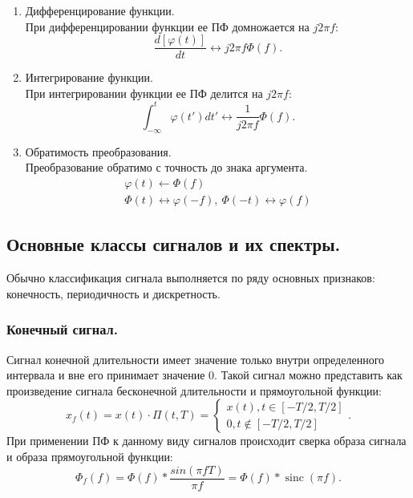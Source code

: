 \documentclass[a4paper,14pt]{extarticle}
\DeclareMathOperator{\sinc}{sinc}
\begin{document}
\begin{enumerate}
\item Дифференцирование функции. \\ При дифференцировании функции ее ПФ домножается на $j 2 \pi f$:
\begin{equation*}
\frac{d[\varphi(t)]}{dt} \leftrightarrow j 2 \pi f \Phi (f).
\end{equation*}

\item Интегрирование функции. \\ При интегрировании функции ее ПФ делится на $j 2 \pi f$:
\begin{equation*}
\int_{-\infty}^{t} \varphi(t') dt' \leftrightarrow \frac{1}{j 2 \pi f} \Phi (f).
\end{equation*}

\item Обратимость преобразования. \\ Преобразование обратимо с точность до знака аргумента. 
\begin{gather*}
\varphi(t) \leftarrow \Phi (f) \\ \Phi(t) \leftrightarrow \varphi (-f), ~ \Phi(-t) \leftrightarrow \varphi(f)
\end{gather*}

\end{enumerate}  


\subsection{Основные классы сигналов и их спектры.}

Обычно классификация сигнала выполняется по ряду основных признаков: конечность, периодичность и дискретность.

\subsubsection{Конечный сигнал.}

Сигнал конечной длительности имеет значение только внутри определенного интервала и вне его принимает значение 0. Такой сигнал можно представить как произведение сигнала бесконечной длительности и прямоугольной функции:
\begin{equation*}
x_f (t) = x(t) \cdot \Pi(t, T) = \begin{cases} x(t), t \in [-T/2, T/2] \\ 0, t \notin  [-T/2, T/2] \end{cases}.
\end{equation*}
При применении ПФ к данному виду сигналов происходит сверка образа сигнала и образа прямоугольной функции:
\begin{equation*}
\Phi_f(f) = \Phi(f) * \frac{sin(\pi f T)}{\pi f} = \Phi(f) * \sinc(\pi f).
\end{equation*}
\end{document}
